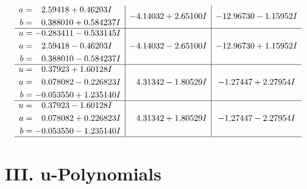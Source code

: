 \documentclass[1p]{elsarticle_modified}
\theoremstyle{definition}
\begin{document}
$$\begin{array}{c|c|c}
\begin{aligned}
a &= \phantom{-}2.59418 + 0.46203 I \\
b &= \phantom{-}0.388010 + 0.584237 I\end{aligned}
 & -4.14032 + 2.65100 I & -12.96730 - 1.15952 I \\ \hline\begin{aligned}
u &= -0.283411 - 0.533145 I \\
a &= \phantom{-}2.59418 - 0.46203 I \\
b &= \phantom{-}0.388010 - 0.584237 I\end{aligned}
 & -4.14032 - 2.65100 I & -12.96730 + 1.15952 I \\ \hline\begin{aligned}
u &= \phantom{-}0.37923 + 1.60128 I \\
a &= \phantom{-}0.078082 - 0.226823 I \\
b &= -0.053550 + 1.235140 I\end{aligned}
 & \phantom{-}4.31342 - 1.80529 I & -1.27447 + 2.27954 I \\ \hline\begin{aligned}
u &= \phantom{-}0.37923 - 1.60128 I \\
a &= \phantom{-}0.078082 + 0.226823 I \\
b &= -0.053550 - 1.235140 I\end{aligned}
 & \phantom{-}4.31342 + 1.80529 I & -1.27447 - 2.27954 I\\
 \hline 
 \end{array}$$\newpage
\newpage\renewcommand{\arraystretch}{1}
\centering \section*{ III. u-Polynomials}
\end{document}
